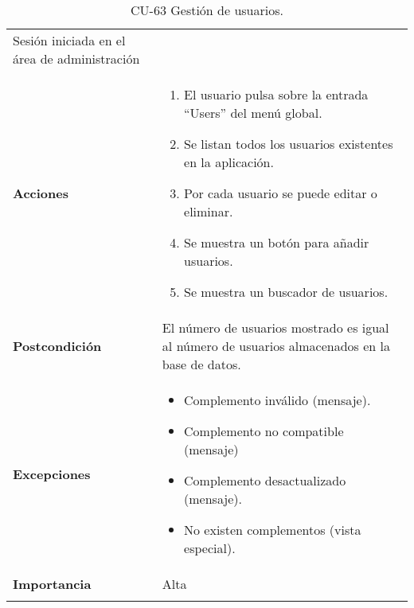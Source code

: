 \begin{longtable}[]{@{}ll@{}}
\begin{minipage}[t]{0.73\columnwidth}
Sesión iniciada en el área de administración\strut
\end{minipage}\tabularnewline
\begin{minipage}[t]{0.21\columnwidth}\raggedright
\textbf{Acciones}\strut
\end{minipage} & \begin{minipage}[t]{0.73\columnwidth}\raggedright
\begin{enumerate}
\def\labelenumi{\arabic{enumi}.}
\tightlist
\item
  El usuario pulsa sobre la entrada ``Users'' del menú global.
\item
  Se listan todos los usuarios existentes en la aplicación.
\item
  Por cada usuario se puede editar o eliminar.
\item
  Se muestra un botón para añadir usuarios.
\item
  Se muestra un buscador de usuarios.
\end{enumerate}\strut
\end{minipage}\tabularnewline
\begin{minipage}[t]{0.21\columnwidth}\raggedright
\textbf{Postcondición}\strut
\end{minipage} & \begin{minipage}[t]{0.73\columnwidth}\raggedright
El número de usuarios mostrado es igual al número de usuarios
almacenados en la base de datos.\strut
\end{minipage}\tabularnewline
\begin{minipage}[t]{0.21\columnwidth}\raggedright
\textbf{Excepciones}\strut
\end{minipage} & \begin{minipage}[t]{0.73\columnwidth}\raggedright
\begin{itemize}
\tightlist
\item
  Complemento inválido (mensaje).
\item
  Complemento no compatible (mensaje)
\item
  Complemento desactualizado (mensaje).
\item
  No existen complementos (vista especial).
\end{itemize}\strut
\end{minipage}\tabularnewline
\begin{minipage}[t]{0.21\columnwidth}\raggedright
\textbf{Importancia}\strut
\end{minipage} & \begin{minipage}[t]{0.73\columnwidth}\raggedright
Alta\strut
\end{minipage}\tabularnewline
\bottomrule
\caption{CU-63 Gestión de usuarios.}
\end{longtable}

